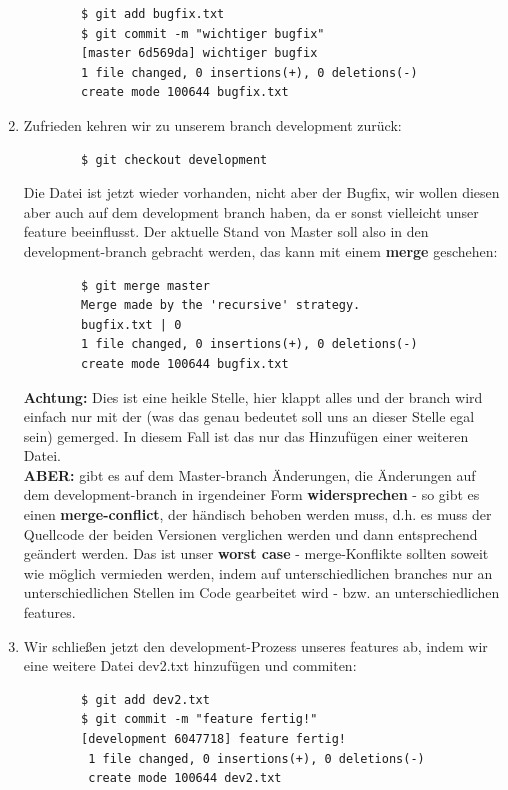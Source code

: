 \documentclass{article}
\begin{document}
\begin{enumerate}
    \begin{verbatim}
        $ git add bugfix.txt
        $ git commit -m "wichtiger bugfix"
        [master 6d569da] wichtiger bugfix
        1 file changed, 0 insertions(+), 0 deletions(-)
        create mode 100644 bugfix.txt
    \end{verbatim}
    \item Zufrieden kehren wir zu unserem branch development zurück: 
    \begin{verbatim}
        $ git checkout development 
    \end{verbatim}
    Die Datei  ist jetzt wieder vorhanden, nicht aber der Bugfix, wir wollen diesen aber auch auf dem development branch haben, da er sonst vielleicht unser feature beeinflusst. Der aktuelle Stand von Master soll also in den development-branch gebracht werden, das kann mit einem \textbf{merge} geschehen:
    \begin{verbatim}
        $ git merge master
        Merge made by the 'recursive' strategy.
        bugfix.txt | 0
        1 file changed, 0 insertions(+), 0 deletions(-)
        create mode 100644 bugfix.txt
    \end{verbatim}
    \textbf{Achtung:} Dies ist eine heikle Stelle, hier klappt alles und der branch wird einfach nur mit der  (was das genau bedeutet soll uns an dieser Stelle egal sein) gemerged. In diesem Fall ist das nur das Hinzufügen einer weiteren Datei. \\
    \textbf{ABER:} gibt es auf dem Master-branch Änderungen, die Änderungen auf dem development-branch in irgendeiner Form \textbf{widersprechen} - so gibt es einen \textbf{merge-conflict}, der händisch behoben werden muss, d.h. es muss der Quellcode der beiden Versionen verglichen werden und dann entsprechend geändert werden. Das ist unser \textbf{worst case} - merge-Konflikte sollten soweit wie möglich vermieden werden, indem auf unterschiedlichen branches nur an unterschiedlichen Stellen im Code gearbeitet wird - bzw. an unterschiedlichen features. 
    \item Wir schließen jetzt den development-Prozess unseres features ab, indem wir eine weitere Datei dev2.txt hinzufügen und commiten:
    \begin{verbatim}
        $ git add dev2.txt
        $ git commit -m "feature fertig!"
        [development 6047718] feature fertig!
         1 file changed, 0 insertions(+), 0 deletions(-)
         create mode 100644 dev2.txt
    \end{verbatim}

\end{enumerate}
\end{document}
